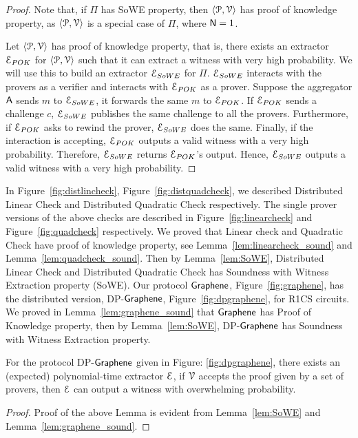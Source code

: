 \begin{proof}
	Note that, if $\Pi$ has SoWE property, then $\langle \mathcal{P},\mathcal{V}\rangle$ has proof of knowledge property, as $\langle \mathcal{P},\mathcal{V}\rangle$ is a special case of $\Pi$, where $\mathsf{N}=1$.
	
	Let $\langle \mathcal{P},\mathcal{V}\rangle$ has proof of knowledge property, that is, there exists an extractor $\mathcal{E}_{POK}$ for $\langle \mathcal{P},\mathcal{V}\rangle$ such that it can extract a witness with very high probability. 
	We will use this to build an extractor $\mathcal{E}_{SoWE}$ for $\Pi$.
	$\mathcal{E}_{SoWE}$ interacts with the provers as a verifier and interacts with $\mathcal{E}_{POK}$ as a prover.
	Suppose the aggregator $\mathsf{A}$ sends $m$ to $\mathcal{E}_{SoWE}$, it forwards the same $m$ to $\mathcal{E}_{POK}$. If $\mathcal{E}_{POK}$ sends a challenge $c$, $\mathcal{E}_{SoWE}$ publishes the same challenge to all the provers. Furthermore, if $\mathcal{E}_{POK}$ asks to rewind the prover, $\mathcal{E}_{SoWE}$ does the same. Finally, if the interaction is accepting, $\mathcal{E}_{POK}$ outputs a valid witness with a very high probability. Therefore, $\mathcal{E}_{SoWE}$ returns $\mathcal{E}_{POK}$'s output. Hence, $\mathcal{E}_{SoWE}$ outputs a valid witness with a very high probability.
\end{proof}
In Figure~\ref{fig:distlincheck}, Figure~\ref{fig:distquadcheck}, we described Distributed Linear Check and Distributed Quadratic Check respectively. The single prover versions of the above checks are described in Figure~\ref{fig:linearcheck} and Figure~\ref{fig:quadcheck} respectively. We proved that Linear check and Quadratic Check have proof of knowledge property, see Lemma~\ref{lem:linearcheck_sound} and Lemma~\ref{lem:quadcheck_sound}. Then by Lemma~\ref{lem:SoWE}, Distributed Linear Check and Distributed Quadratic Check has Soundness with Witness Extraction property (SoWE). Our protocol $\textsf{Graphene}$, Figure~\ref{fig:graphene}, has the distributed version, DP-$\textsf{Graphene}$, Figure~\ref{fig:dpgraphene}, for R1CS circuits. We proved in Lemma~\ref{lem:graphene_sound} that $\textsf{Graphene}$ has Proof of Knowledge property, then by Lemma~\ref{lem:SoWE}, DP-$\textsf{Graphene}$ has Soundness with Witness Extraction property. 
\begin{lemma}
	For the protocol DP-$\textsf{Graphene}$ given in Figure: \ref{fig:dpgraphene}, there exists an (expected) polynomial-time extractor $\mathcal{E}$, if $\mathcal{V}$ accepts the proof given by a set of provers, then $\mathcal{E}$ can output a witness with overwhelming probability.
\end{lemma}
\begin{proof}
Proof of the above Lemma is evident from Lemma~\ref{lem:SoWE} and Lemma~\ref{lem:graphene_sound}.
\end{proof}

